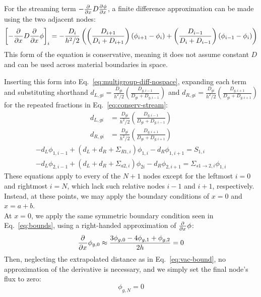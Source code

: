 \documentclass[11pt]{article} %
\begin{document}
For the streaming term $-\frac{\partial^{}}{\partial{x}^{}}D\frac{\partial^{}\phi}{\partial{x}^{}}$, a finite difference approximation can be made using the two adjacent nodes\cite{OpenMC}:
\newcommand{\pfrac}{\left(\frac{D_{i+1}}{D_i+D_{i+1}}\right)}
\newcommand{\mfrac}{\left(\frac{D_{i-1}}{D_i+D_{i-1}}\right)}
\newcommand{\ddx}{\pd{}{x}{}}
\begin{equation}
    \label{eq:conserv-stream}
    \left[-\ddx D\ddx\phi\right]_i = -\frac{D_i}{h^2/2}\left(\pfrac\left(\phi_{i+1}-\phi_i\right)+\mfrac\left(\phi_{i-1}-\phi_i\right)\right) 
\end{equation}
This form of the equation is conservative, meaning it does not assume constant $D$ and can be used across material boundaries in space.
\newcommand{\dL}[1]{d_{L,#1}}
\newcommand{\dR}[1]{d_{R,#1}}
\newcommand{\dLR}[1]{d_{LR,#1}}

\renewcommand{\pfrac}{\left(\frac{D_{g,i+1}}{D_{gi}+D_{g,i+1}}\right)}
\renewcommand{\mfrac}{\left(\frac{D_{g,i-1}}{D_{gi}+D_{g,i-1}}\right)}
Inserting this form into Eq.~\ref{eq:multigroup-diff-nospace}, expanding each term and substituting shorthand $\dL{gi}=\frac{D_{gi}}{h^2/2}\mfrac$ and $\dR{gi}=\frac{D_{gi}}{h^2/2}\pfrac$ for the repeated fractions in Eq.~\ref{eq:conserv-stream}:
\begin{equation}
    \label{eq:shorthand}
    \begin{split}
        \dL{gi}&=\frac{D_{gi}}{h^2/2}\mfrac\\
        \dR{gi}&=\frac{D_{gi}}{h^2/2}\pfrac
    \end{split}
\end{equation}
\begin{equation}
    \begin{gathered}
        -d_L\phi_{1,i-1} + \left(d_L+d_R+\Sigma_{R1,i}\right)\phi_{1,i} - d_R\phi_{1,i+1} = S_{1,i} \\
        -d_L\phi_{2,i-1} + \left(d_L+d_R+\Sigma_{a2,i}\right)\phi_{2i} - d_R\phi_{2,i+1} = \Sigma_{s1\rightarrow2,i}\phi_{1,i}
    \end{gathered}
    \label{eq:center-findiff}
\end{equation}
These equations apply to every of the $N+1$ nodes except for the leftmost $i=0$ and rightmost $i=N$, which lack such relative nodes $i-1$ and $i+1$, respectively.
Instead, at these points, we may apply the boundary conditions of $x=0$ and $x=a+b$.\\

At $x=0$, we apply the same symmetric boundary condition seen in Eq.~\ref{eq:bounds}, using a right-handed approximation of $\ddx\phi$:
\begin{equation}
    \label{eq:sym-findiff}
    \ddx\phi_{g,0} \approx \frac{3\phi_{g,0}-4\phi_{g,1}+\phi_{g,2}}{2h}=0
\end{equation}
Then, neglecting the extrapolated distance as in Eq.~\ref{eq:vac-bound}, no approximation of the derivative is necessary, and we simply set the final node's flux to zero:
\begin{equation}
    \label{eq:vac-findiff}
    \phi_{g,N} = 0
\end{equation}
\end{document}
